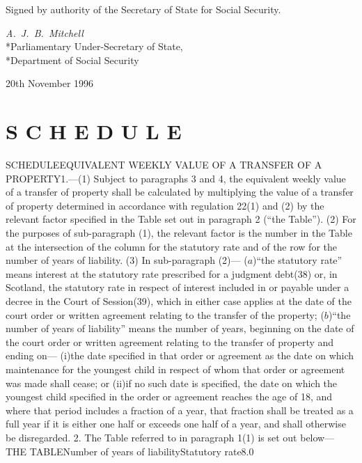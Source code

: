 \documentclass[a4paper]{article}
\newcommand{\parthead}{}
\begin{document}
\bigskip

Signed by authority of the Secretary of State for Social Security.

{\raggedleft
\emph{A.\ J.\ B.\ Mitchell}\\*Parliamentary Under-Secretary of
State,\\*Department of Social Security

}

20th November 1996

\clearpage

\part[Schedule]{S C H E D U L E}

\renewcommand\parthead{--- Schedule}

SCHEDULEEQUIVALENT WEEKLY VALUE OF A TRANSFER OF A PROPERTY1.—(1) Subject to
paragraphs 3 and 4, the equivalent weekly value of a transfer of property shall
be calculated by multiplying the value of a transfer of property determined in
accordance with regulation 22(1) and (2) by the relevant factor specified in the
Table set out in paragraph 2 (“the Table”).
(2) For the purposes of sub-paragraph (1), the relevant factor is the number in
the Table at the intersection of the column for the statutory rate and of the
row for the number of years of liability.
(3) In sub-paragraph (2)—
($a$)“the statutory rate” means interest at the statutory rate prescribed for a
judgment debt(38) or, in Scotland, the statutory rate in respect of interest
included in or payable under a decree in the Court of Session(39), which in
either case applies at the date of the court order or written agreement relating
to the transfer of the property;
($b$)“the number of years of liability” means the number of years, beginning on
the date of the court order or written agreement relating to the transfer of
property and ending on—
(i)the date specified in that order or agreement as the date on which
maintenance for the youngest child in respect of whom that order or agreement
was made shall cease; or
(ii)if no such date is specified, the date on which the youngest child specified
in the order or agreement reaches the age of 18,
and where that period includes a fraction of a year, that fraction shall be
treated as a full year if it is either one half or exceeds one half of a year,
and shall otherwise be disregarded.
2.  The Table referred to in paragraph 1(1) is set out below—
THE TABLENumber of years of liabilityStatutory
rate8.0%
\end{document}
